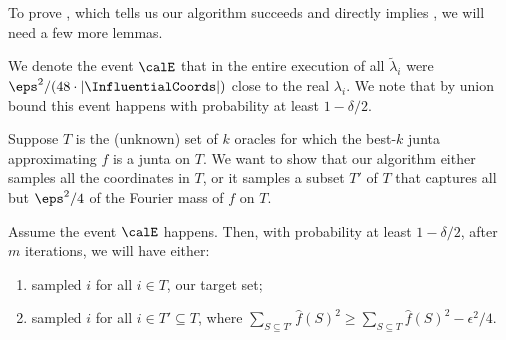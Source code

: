 To prove , which tells us our algorithm succeeds and directly implies , we will need a few more lemmas.


We denote the event $\calE$ that in the entire execution of  all $\tilde{\lambda}_i$ were $\eps^2/(48\cdot |\InfluentialCoords|)$ close to the real $\lambda_i$.
We note that by union bound this event happens with probability at least $1-\delta/2$.


Suppose $T$ is the (unknown) set of $k$ oracles for which the best-$k$ junta approximating $f$ is a junta on $T$. We want to show that our algorithm either samples all the coordinates in $T$, or it samples a subset $T'$ of $T$ that captures all but $\eps^2/4$ of the Fourier mass of $f$ on $T$.

\begin{claim}
\label{claim:Sprime-correctness}
Assume the event $\calE$ happens. Then, with probability at least $1-\delta/2$, after $m$ iterations, we will have either:
 \begin{enumerate}
     \item sampled $i$ for all $i\in T$, our target set;
     \item sampled $i$ for all $i \in T' \subseteq T$, where 
     $\sum_{S \subseteq T'} \hat{f}(S)^2 \geq \sum_{S \subseteq T} \hat{f}(S)^2 - \epsilon^2/4$. 
 \end{enumerate}
\end{claim}

